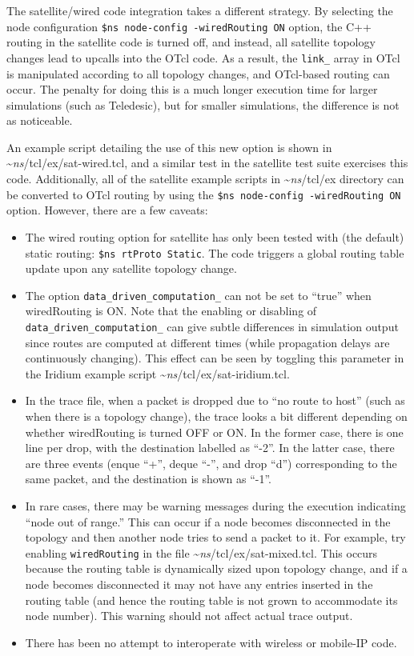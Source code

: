 The satellite/wired code integration takes a different strategy.  By
selecting the node configuration
{\tt \$ns node-config -wiredRouting ON} option, the C++
routing in the satellite code is turned off, and instead, all satellite 
topology changes lead to upcalls into the OTcl code.  As a result, 
the {\tt link\_} array in OTcl is manipulated according to all topology 
changes, and OTcl-based routing can occur.  The penalty for doing this 
is a much longer execution time for larger simulations (such as Teledesic), 
but for smaller simulations, the difference is not as noticeable.

An example script detailing the use of this new option is shown in
\textasciitilde\emph{ns}/{tcl/ex/sat-wired.tcl}, and a similar test in the satellite test suite
exercises this code.  Additionally, all of the satellite example scripts
in \textasciitilde\emph{ns}/{tcl/ex} directory can be converted to OTcl routing by using the 
{\tt \$ns node-config -wiredRouting ON} option.  However, there are a
few caveats: 
\begin{itemize}
\item The wired routing option for satellite has only been tested with
(the default) static routing: {\tt \$ns rtProto Static}.  The code triggers
a global routing table update upon any satellite topology change.
\item The option {\tt data\_driven\_computation\_}
can not be set to ``true'' when wiredRouting is ON.  Note that the enabling
or disabling of {\tt data\_driven\_computation\_}  can give subtle differences 
in simulation output since routes are computed at different times (while
propagation delays are continuously changing).  This effect can be seen
by toggling this parameter in the Iridium example 
script \textasciitilde\emph{ns}/{tcl/ex/sat-iridium.tcl}.
\item In the trace file, when a packet is dropped due to ``no route to
host'' (such as when there is a topology change), the trace looks a bit
different depending on whether wiredRouting is turned OFF or ON.  In the
former case, there is one line per drop, with the destination labelled
as ``-2''.  In the latter case, there are three events (enque ``+'', 
deque ``-'', and drop ``d'') corresponding to the same packet, and the
destination is shown as ``-1''.  
\item In rare cases, there may be warning messages during the execution
indicating ``node out of range.''  This can occur if a node becomes
disconnected in the topology and then another node tries to send a packet
to it.  For example, try enabling {\tt wiredRouting} in the file
\textasciitilde\emph{ns}/{tcl/ex/sat-mixed.tcl}.  This occurs because the routing table is
dynamically sized upon topology change, and if a node becomes disconnected  
it may not have any entries inserted in the routing table (and hence
the routing table is not grown to accommodate its node number).  This
warning should not affect actual trace output.
\item There has been no attempt to interoperate with wireless or 
mobile-IP code.
\end{itemize}
 


